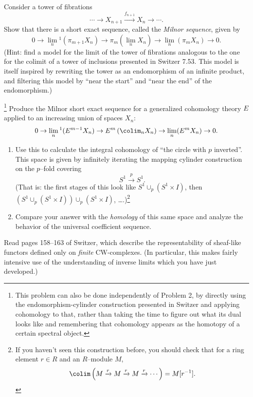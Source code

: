 \begin{problem}
Consider a tower of fibrations \[\cdots \to X_{n+1} \xrightarrow{f_{n+1}} X_n \to \cdots.\]  Show that there is a short exact sequence, called the \textit{Milnor sequence}, given by \[0 \to \lim_n{}^1 \left( \pi_{m+1} X_n \right) \to \pi_m \left( \lim_n X_n \right) \to \lim_n \left( \pi_m X_n \right) \to 0.\]  (Hint: find a model for the limit of the tower of fibrations analogous to the one for the colimit of a tower of inclusions presented in Switzer 7.53.  This model is itself inspired by rewriting the tower as an endomorphism of an infinite product, and filtering this model by ``near the start'' and ``near the end'' of the endomorphism.)
\end{problem}

\begin{problem}\footnote{This problem can also be done independently of Problem 2, by directly using the endomorphism-cylinder construction presented in Switzer and applying cohomology to that, rather than taking the time to figure out what its dual looks like and remembering that cohomology appears as the homotopy of a certain spectral object.}
Produce the Milnor short exact sequence for a generalized cohomology theory $E$ applied to an increasing union of spaces $X_n$: \[0 \to \lim_n{}^1 (E^{m-1} X_n) \to E^m \left(\colim_n X_n\right) \to \lim_n (E^m X_n) \to 0.\]
\end{problem}

\begin{problem}
\begin{enumerate}
    \item Use this to calculate the integral cohomology of ``the circle with $p$ inverted''.  This space is given by infinitely iterating the mapping cylinder construction on the $p$--fold covering \[S^1 \xrightarrow{p} S^1.\]  (That is: the first stages of this look like $S^1 \cup_p (S^1 \times I)$, then $(S^1 \cup_p (S^1 \times I)) \cup_p (S^1 \times I)$, \ldots.)\footnote{If you haven't seen this construction before, you should check that for a ring element $r \in R$ and an $R$--module $M$, \[\colim \left(M \xrightarrow{r} M \xrightarrow{r} M \xrightarrow{r} \cdots\right) = M[r^{-1}].\]}
    \item Compare your answer with the \emph{homology} of this same space and analyze the behavior of the universal coefficient sequence.
\end{enumerate}
\end{problem}

\begin{task}
Read pages 158--163 of Switzer, which describe the representability of sheaf-like functors defined only on \emph{finite} CW-complexes.  (In particular, this makes fairly intensive use of the understanding of inverse limits which you have just developed.)
\end{task}


